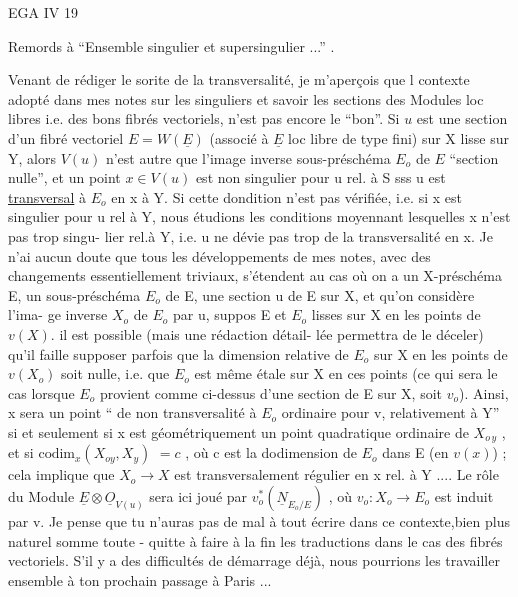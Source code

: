 
EGA IV 19

Remords à ``Ensemble singulier et supersingulier ...'' .

Venant de rédiger le sorite de la transversalité, je m'aperçois que l
contexte adopté dans mes notes sur les  singuliers et 
savoir les sections des Modules loc libres i.e. des bons fibrés vectoriels,
n'est pas encore le ``bon''. Si $u$ est une section d'un fibré vectoriel
$E = W(\underline{E})$ (associé à $\underline{E}$ loc libre de type fini) sur X lisse sur Y, alors $V(u)$
n'est autre que l'image inverse   sous-préschéma $E_{o}$ de $E$ ``section nulle'', et un point $x\in V(u)$
est non singulier pour u rel. à S sss u est \uline{transversal} à $E_{o}$ en x  à Y.
Si cette dondition n'est pas vérifiée, i.e. si x est singulier pour u rel à
Y, nous étudions les conditions moyennant lesquelles x n'est pas trop singu-%
lier rel.à Y, i.e. u ne dévie pas trop de la transversalité en x. Je n'ai
aucun doute que tous les développements de mes notes, avec des changements
essentiellement triviaux, s'étendent au cas où on a un X-préschéma E, un
sous-préschéma $E_{o}$ de E, une section  u de E sur X, et qu'on considère l'ima-%
ge inverse $X_{o}$ de $E_{o}$ par u,  suppos E et $E_{o}$ lisses sur X en les points de $v(X)$. il est possible (mais  une rédaction détail-%
lée permettra de le déceler) qu'il faille supposer parfois que la dimension
relative de $E_{o}$ sur X en les points de $v(X_{o})$ soit nulle, i.e. que $E_{o}$ est
même étale sur X en ces points (ce qui sera le cas lorsque $E_{o}$ provient comme
ci-dessus d'une section de E sur X, soit $v_{o}$). Ainsi, x sera un point
`` de non transversalité à $E_{o}$ ordinaire pour v, relativement à Y'' si et seulement si  x est
géométriquement un point quadratique ordinaire de $X_{o\,y}$ , et si $\mathrm{codim}_{x}(X_{oy},X_{y})$
$= c$ , où c est la dodimension de $E_{o}$ dans E (en $v(x)$) ; cela implique que
$X_{o}\longrightarrow X$ est  transversalement régulier en x rel. à Y .... Le rôle du Module
$\underline{E}\otimes\underline{O}_{V(u)}$ sera ici joué par $v_{o}^{*}(\underline{N}_{E_{o}/E})$ , où $v_{o}:X_{o}\longrightarrow E_{o}$ est induit par v. Je
pense que tu n'auras pas de mal à tout écrire dans ce contexte,bien plus
naturel somme toute - quitte à faire à la fin les traductions dans le cas
des fibrés vectoriels. S'il y a des difficultés de démarrage déjà, nous
pourrions les travailler ensemble à ton prochain passage à Paris ... 

